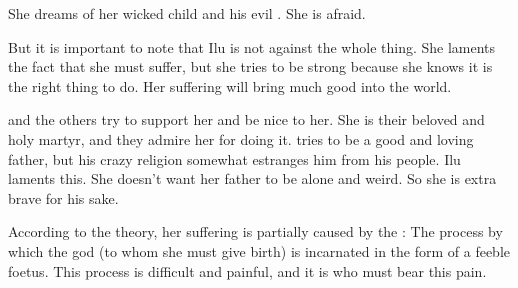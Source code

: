 She dreams of her wicked child and his evil . 
She is afraid. 

But it is important to note that Ilu is not against the whole thing. 
She laments the fact that she must suffer, but she tries to be strong because she knows it is the right thing to do. 
Her suffering will bring much good into the world. 

\Semiza{} and the others try to support her and be nice to her. 
She is their beloved and holy martyr, and they admire her for doing it. 
\Semiza{} tries to be a good and loving father, but his crazy religion somewhat estranges him from his people. 
Ilu laments this. 
She doesn't want her father to be alone and weird. 
So she is extra brave for his sake. 


According to the theory, her suffering is partially caused by the \kenosis: 
The process by which the god (to whom she must give birth) is incarnated in the form of a feeble foetus. 
This process is difficult and painful, and it is \Ilu{} who must bear this pain. 






